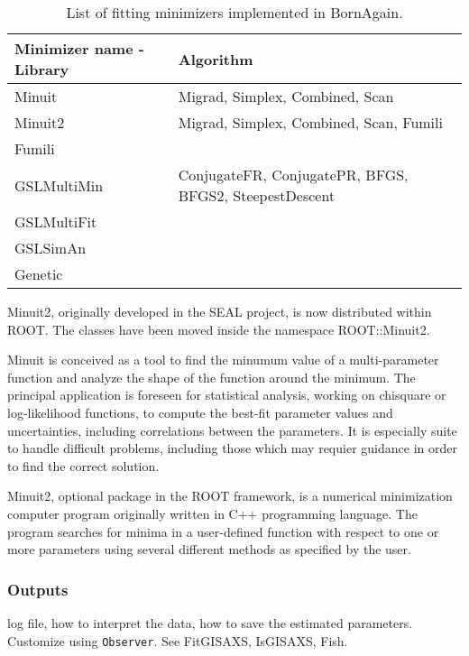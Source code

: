 \begin{table}[h]
\centering
\begin{tabular}{@{}ll@{}}
\hline
\hline
\textbf{Minimizer name - Library} & \textbf{Algorithm} \\
\hline
Minuit & Migrad, Simplex, Combined, Scan\\
Minuit2 & Migrad, Simplex, Combined, Scan, Fumili \\
Fumili & \\
GSLMultiMin & ConjugateFR, ConjugatePR, BFGS, BFGS2, SteepestDescent \\
GSLMultiFit & \\
GSLSimAn & \\ %
Genetic &  \\ %
\hline
\hline
\end{tabular}
\label{table:fit_minimizers}
\caption{List of fitting minimizers implemented in BornAgain.}
\end{table}




Minuit2, originally developed in the SEAL project, is now distributed
within ROOT. The classes have been moved inside the namespace
ROOT::Minuit2. 

Minuit is conceived as a tool to find the minumum value of a
multi-parameter function and analyze the shape of the function around
the minimum. The principal application is foreseen for statistical
analysis, working on chisquare or log-likelihood functions, to compute
the best-fit parameter values and uncertainties, including
correlations between the parameters. It is especially suite to handle
difficult problems, including those which may requier guidance in
order to find the correct solution.

Minuit2, optional package in the ROOT framework, is a numerical minimization computer program
originally written in C++ programming language. The program searches for minima in a user-defined function with
respect to one or more parameters using several different methods as
specified by the user. 
\subsubsection{Outputs}
log file, how to interpret the data, how to save the estimated parameters.
Customize using \texttt{Observer}.
See FitGISAXS, IsGISAXS, Fish.
